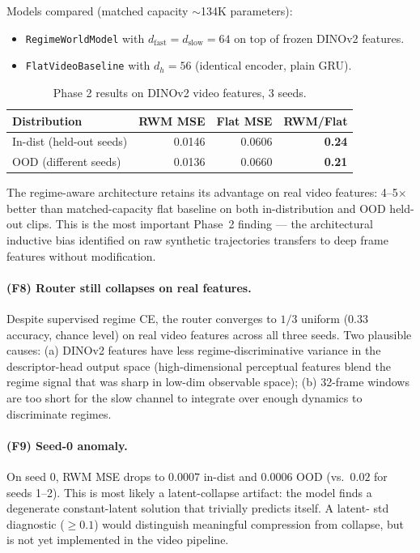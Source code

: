 \documentclass[11pt,a4paper]{article}
\begin{document}
Models compared (matched capacity $\sim$134K parameters):
\begin{itemize}
\item \verb|RegimeWorldModel| with $d_{\text{fast}} = d_{\text{slow}} = 64$
  on top of frozen DINOv2 features.
\item \verb|FlatVideoBaseline| with $d_h = 56$ (identical encoder, plain GRU).
\end{itemize}

\begin{table}[h]
\centering
\caption{Phase 2 results on DINOv2 video features, 3 seeds.}
\label{tab:rwm-video}
\begin{tabular}{lrrr}
\toprule
Distribution & RWM MSE & Flat MSE & RWM/Flat \\
\midrule
In-dist (held-out seeds) & 0.0146 & 0.0606 & \textbf{0.24} \\
OOD (different seeds)    & 0.0136 & 0.0660 & \textbf{0.21} \\
\bottomrule
\end{tabular}
\end{table}

The regime-aware architecture retains its advantage on real video
features: 4--5$\times$ better than matched-capacity flat baseline
on both in-distribution and OOD held-out clips. This is the most
important Phase~2 finding --- the architectural inductive bias
identified on raw synthetic trajectories transfers to deep frame
features without modification.

\paragraph{(F8) Router still collapses on real features.} Despite
supervised regime CE, the router converges to $1/3$ uniform
($0.33$ accuracy, chance level) on real video features across all
three seeds. Two plausible causes: (a) DINOv2 features have less
regime-discriminative variance in the descriptor-head output space
(high-dimensional perceptual features blend the regime signal that
was sharp in low-dim observable space); (b) 32-frame windows are
too short for the slow channel to integrate over enough dynamics
to discriminate regimes.

\paragraph{(F9) Seed-0 anomaly.} On seed 0, RWM MSE drops to $0.0007$
in-dist and $0.0006$ OOD (vs.\ $0.02$ for seeds 1--2). This is most
likely a latent-collapse artifact: the model finds a degenerate
constant-latent solution that trivially predicts itself. A latent-
std diagnostic ($\geq 0.1$) would distinguish meaningful compression
from collapse, but is not yet implemented in the video pipeline.
\end{document}
